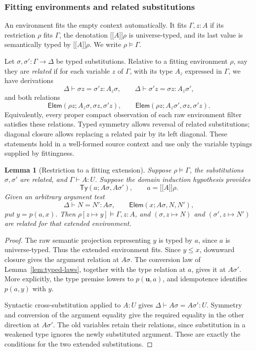\documentclass[11pt,a4paper]{article}
\newtheorem{lemma}[theorem]{Lemma}
\theoremstyle{definition}
\theoremstyle{remark}
\newcommand{\ev}[1]{\mathopen{[\![}#1\mathclose{]\!]}}
\newcommand{\TyRel}{\mathsf{Ty}}
\newcommand{\ElemRel}{\mathsf{Elem}}
\begin{document}
\subsubsection{Fitting environments and related substitutions}

An environment fits the empty context automatically. It fits
$\Gamma,z:A$ if its restriction $\rho$ fits $\Gamma$, the denotation
$\ev A\rho$ is universe-typed, and its last value is semantically typed
by $\ev A\rho$. We write $\rho\models\Gamma$.

Let $\sigma,\sigma':\Gamma\to\Delta$ be typed substitutions. Relative
to a fitting environment $\rho$, say they are \emph{related} if for each
variable $z$ of $\Gamma$, with its type $A_z$ expressed in $\Gamma$,
we have derivations
\[
 \Delta\vdash\sigma z=\sigma'z:A_z\sigma,\qquad
 \Delta\vdash\sigma'z=\sigma z:A_z\sigma',
\]
and both relations
\begin{equation}\label{eq:related-substitutions}
 \ElemRel(\rho z;A_z\sigma,\sigma z,\sigma'z),\qquad
 \ElemRel(\rho z;A_z\sigma',\sigma z,\sigma'z).
\end{equation}
Equivalently, every proper compact observation of each raw environment
filter satisfies these relations. Typed symmetry allows reversal of
related substitutions; diagonal closure allows replacing a related pair
by its left diagonal. These statements hold in a well-formed source
context and use only the variable typings supplied by fittingness.

\begin{lemma}[Restriction to a fitting extension]\label{lem:argument-restriction}
Suppose $\rho\models\Gamma$, the substitutions $\sigma,\sigma'$ are
related, and $\Gamma\vdash A:U$. Suppose the domain induction hypothesis
provides
\[
 \TyRel(a;A\sigma,A\sigma'),\qquad a=\ev A\rho.
\]
Given an arbitrary argument test
\[
 \Delta\vdash N=N':A\sigma,\qquad
 \ElemRel(x;A\sigma,N,N'),
\]
put $y=p(a,x)$. Then $\rho[z\mapsto y]\models\Gamma,z:A$, and
$(\sigma,z\mapsto N)$ and $(\sigma',z\mapsto N')$ are related for
that extended environment.
\end{lemma}
\begin{proof}
The raw semantic projection representing $y$ is typed by $a$, since
$a$ is universe-typed. Thus the extended environment fits. Since
$y\leq x$, downward closure gives the argument relation at $A\sigma$.
The conversion law of Lemma~\ref{lem:typed-laws}, together with the type
relation at $a$, gives it at $A\sigma'$. More explicitly, the type
premise lowers to $p(\mathbf u,a)$, and idempotence identifies
$p(a,y)$ with $y$.

Syntactic cross-substitution applied to $A:U$ gives
$\Delta\vdash A\sigma=A\sigma':U$. Symmetry and conversion of the
argument equality give the required equality in the other direction at
$A\sigma'$. The old variables retain their relations, since substitution
in a weakened type ignores the newly substituted argument. These are
exactly the conditions for the two extended substitutions.
\end{proof}
\end{document}
